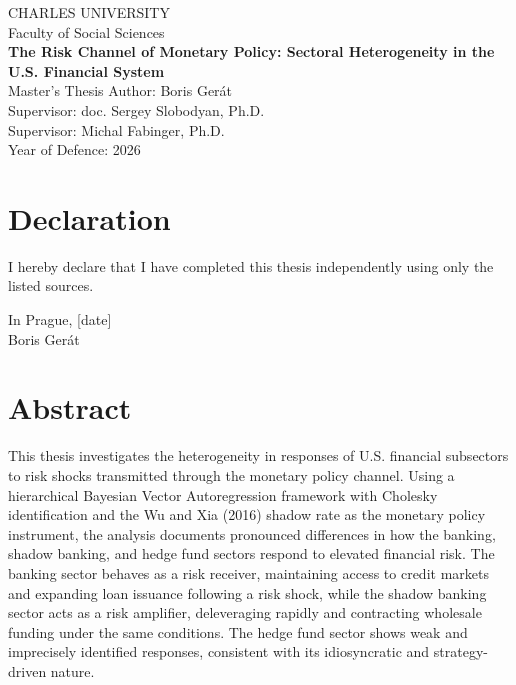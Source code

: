 \documentclass[12pt,a4paper]{report}\usepackage[a4paper, top=2.5cm, bottom=2.5cm, left=2.5cm, right=2.5cm]{geometry}
\begin{document}
\begin{titlepage}
\centering
{\Large CHARLES UNIVERSITY}\\
\vspace{1em}
{\large Faculty of Social Sciences}\\
\vspace{2em}
{\LARGE \textbf{The Risk Channel of Monetary Policy: Sectoral Heterogeneity in the U.S. Financial System}}\\
\vspace{1em}
\vfill
Master's Thesis
\vspace{2em}
Author: Boris Gerát\\
Supervisor: doc. Sergey Slobodyan, Ph.D.\\
Supervisor: Michal Fabinger, Ph.D.\\
Year of Defence: 2026
\end{titlepage}

\chapter*{Declaration}
I hereby declare that I have completed this thesis independently using only the listed sources.

\vspace{2em}
In Prague, [date]\\
Boris Gerát

\chapter*{Abstract}

This thesis investigates the heterogeneity in responses of U.S. financial subsectors
to risk shocks transmitted through the monetary policy channel. Using a hierarchical
Bayesian Vector Autoregression framework with Cholesky identification and the Wu and
Xia (2016) shadow rate as the monetary policy instrument, the analysis documents
pronounced differences in how the banking, shadow banking, and hedge fund sectors
respond to elevated financial risk. The banking sector behaves as a risk receiver,
maintaining access to credit markets and expanding loan issuance following a risk
shock, while the shadow banking sector acts as a risk amplifier, deleveraging rapidly
and contracting wholesale funding under the same conditions. The hedge fund sector
shows weak and imprecisely identified responses, consistent with its idiosyncratic
and strategy-driven nature.
\end{document}
